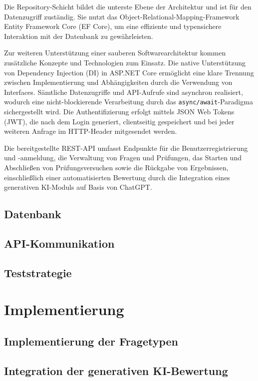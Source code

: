 \documentclass[a4paper,12pt]{article}
\begin{document}
Die Repository-Schicht bildet die unterste Ebene der Architektur und ist für den Datenzugriff zuständig. Sie nutzt das Object-Relational-Mapping-Framework Entity Framework Core (EF Core), um eine effiziente und typensichere Interaktion mit der Datenbank zu gewährleisten.

Zur weiteren Unterstützung einer sauberen Softwarearchitektur kommen zusätzliche Konzepte und Technologien zum Einsatz. Die native Unterstützung von Dependency Injection (DI) in ASP.NET Core ermöglicht eine klare Trennung zwischen Implementierung und Abhängigkeiten durch die Verwendung von Interfaces. Sämtliche Datenzugriffe und API-Aufrufe sind asynchron realisiert, wodurch eine nicht-blockierende Verarbeitung durch das \texttt{async/await}-Paradigma sichergestellt wird. Die Authentifizierung erfolgt mittels JSON Web Tokens (JWT), die nach dem Login generiert, clientseitig gespeichert und bei jeder weiteren Anfrage im HTTP-Header mitgesendet werden.

Die bereitgestellte REST-API umfasst Endpunkte für die Benutzerregistrierung und -anmeldung, die Verwaltung von Fragen und Prüfungen, das Starten und Abschließen von Prüfungsversuchen sowie die Rückgabe von Ergebnissen, einschließlich einer automatisierten Bewertung durch die Integration eines generativen KI-Moduls auf Basis von ChatGPT.

\subsection{Datenbank}
\subsection{API-Kommunikation}
\subsection{Teststrategie}

\newpage

\section{Implementierung}
\subsection{Implementierung der Fragetypen}
\subsection{Integration der generativen KI-Bewertung}
\end{document}
